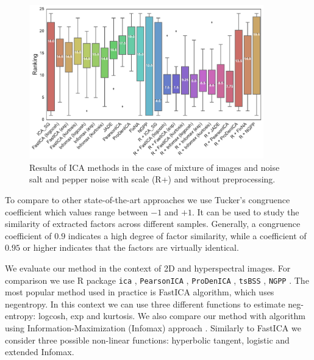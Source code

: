 \begin{figure}[t]
\normalsize
\begin{center}
\includegraphics[width=4.0in]{ranking/images_boxplot-r3.pdf}
\end{center}
\caption{Results of ICA methods in the case of mixture of images and noise salt and pepper noise with scale (R+) and without preprocessing.}
\label{fig:rank2}
\end{figure}

To compare \ICA{} to other state-of-the-art approaches we use 
Tucker's congruence coefficient \cite{lorenzo2006tucker} which values range between $-1$ and $+1$. It can be used to study the similarity of extracted factors across different samples. Generally, a congruence coefficient of $0.9$ indicates a high degree of factor similarity, while a coefficient of $0.95$ or higher indicates that the factors are virtually identical. 

We evaluate our method in the context of 2D and hyperspectral images. 
For comparison we use R package {\tt ica} \cite{ica}, {\tt PearsonICA} \cite{pearsonica}, {\tt ProDenICA} \cite{prodenica}, {\tt tsBSS} \cite{tsBSS}, {\tt NGPP} \cite{virta2016projection}.
The most popular method used in practice is FastICA \cite{hyvarinen1999fast,helwig2013critique} algorithm, which uses negentropy. In this context we can use three different functions to estimate neg-entropy:
logcosh, exp and kurtosis.
We also compare our method with algorithm using Information-Maximization (Infomax) approach \cite{bell1995information}. Similarly to FastICA we consider three possible non-linear functions: hyperbolic tangent, logistic and extended Infomax.
%
%

